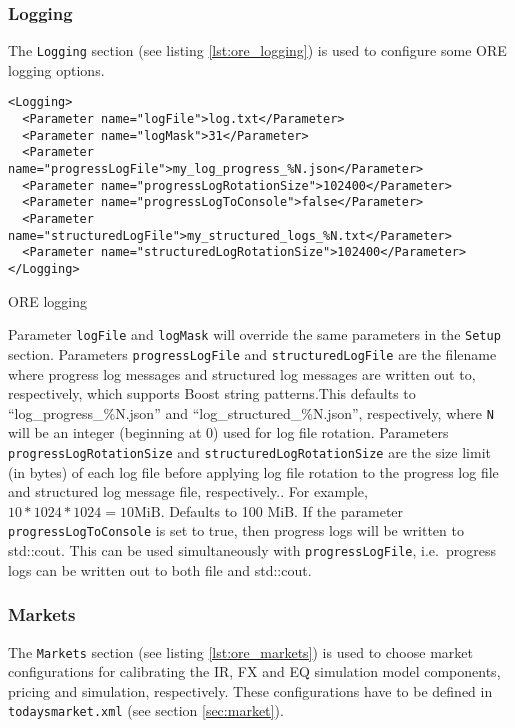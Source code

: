 {\subsubsection{Logging}\label{sec:master_input_logging}
The {\tt Logging} section (see listing \ref{lst:ore_logging}) is used to configure some ORE logging options.
\begin{listing}[H]
\begin{verbatim}
<Logging>
  <Parameter name="logFile">log.txt</Parameter>
  <Parameter name="logMask">31</Parameter>
  <Parameter name="progressLogFile">my_log_progress_%N.json</Parameter>
  <Parameter name="progressLogRotationSize">102400</Parameter>
  <Parameter name="progressLogToConsole">false</Parameter>
  <Parameter name="structuredLogFile">my_structured_logs_%N.txt</Parameter>
  <Parameter name="structuredLogRotationSize">102400</Parameter>
</Logging>
\end{verbatim}
\caption{ORE logging}
\label{lst:ore_logging}
\end{listing}
Parameter {\tt logFile} and {\tt logMask} will override the same parameters in the {\tt Setup} section.
Parameters {\tt progressLogFile} and {\tt structuredLogFile} are the filename where progress log messages
and structured log messages are written out to, respectively, which supports Boost string patterns.This defaults to ``log\_progress\_\%N.json'' and ``log\_structured\_\%N.json'', respectively, where {\tt N} will be an integer (beginning at 0) used for log file rotation.
Parameters {\tt progressLogRotationSize} and {\tt structuredLogRotationSize} are the size limit (in bytes)
of each log file before applying log file rotation to the progress log file and structured log message file,
respectively.. For example, $10 * 1024 * 1024 = 10 \text{MiB}$. Defaults to 100 MiB.
If the parameter {\tt progressLogToConsole} is set to true, then progress logs will be written to std::cout.
This can be used simultaneously with {\tt progressLogFile}, i.e.\ progress logs can be written out
to both file and std::cout.

\subsubsection*{Markets}\label{sec:master_input_markets}

The {\tt Markets} section (see listing \ref{lst:ore_markets}) is used to choose market configurations for calibrating
the IR, FX and EQ simulation model components, pricing and simulation, respectively. These configurations have to be 
defined in {\tt todaysmarket.xml} (see section \ref{sec:market}).

}
